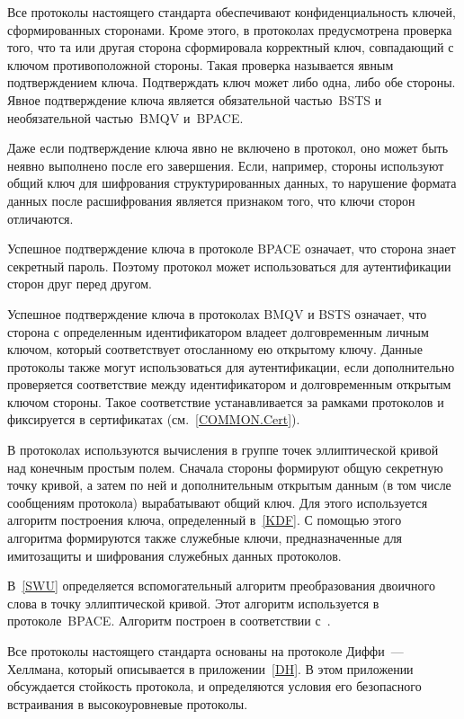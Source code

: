 Все протоколы настоящего стандарта обеспечивают 
конфиденциальность ключей, сформированных сторонами.
%
Кроме этого, в протоколах предусмотрена проверка того, 
что та или другая сторона сформировала корректный ключ,
совпадающий с ключом противоположной стороны.
%
Такая проверка называется явным подтверждением ключа.
%
Подтверждать ключ может либо одна, 
либо обе стороны.
%
Явное подтверждение ключа является обязательной частью~BSTS
и необязательной частью~BMQV и~BPACE. 

Даже если подтверждение ключа явно не включено в протокол,
оно может быть неявно выполнено после его завершения.
Если, например, стороны используют общий ключ для 
шифрования структурированных данных, 
то нарушение формата данных после расшифрования 
является признаком того, что ключи сторон отличаются.

Успешное подтверждение ключа в протоколе BPACE означает, что 
сторона знает секретный пароль.
%
Поэтому протокол может использоваться для аутентификации
сторон друг перед другом.

Успешное подтверждение ключа в протоколах BMQV и BSTS означает, 
что сторона с определенным идентификатором
владеет долговременным личным ключом, 
который соответствует отосланному ею открытому ключу. 
Данные протоколы также могут использоваться для аутентификации,
если дополнительно проверяется соответствие между 
идентификатором и долговременным открытым ключом стороны. 
Такое соответствие устанавливается 
за рамками протоколов и фиксируется 
в сертификатах (см.~\ref{COMMON.Cert}).

В протоколах используются вычисления в группе 
точек эллиптической кривой над конечным простым полем.
%
Сначала стороны формируют общую секретную точку кривой,
а затем по ней и дополнительным открытым данным
(в том числе сообщениям протокола) 
вырабатывают общий ключ.
%
Для этого используется алгоритм построения ключа, 
определенный в~\ref{KDF}.  
%
С помощью этого алгоритма формируются 
также служебные ключи, 
предназначенные для имитозащиты и шифрования 
служебных данных протоколов.

В~\ref{SWU} определяется вспомогательный алгоритм 
преобразования двоичного слова в точку эллиптической кривой.
Этот алгоритм используется в протоколе~BPACE.
Алгоритм построен в соответствии с~\cite{SWU}.

Все протоколы настоящего стандарта основаны на протоколе
Диффи~--- Хеллмана, который описывается в приложении~\ref{DH}.
В этом приложении обсуждается стойкость протокола,
и определяются условия его безопасного встраивания 
в высокоуровневые протоколы. 

